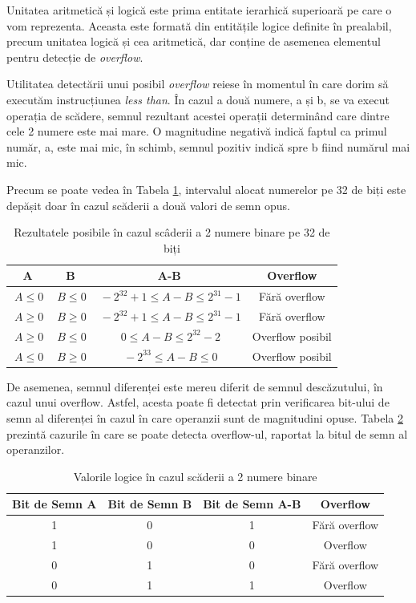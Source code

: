 \documentclass[12pt]{article}
\begin{document}
Unitatea aritmetică și logică este prima entitate ierarhică superioară pe care o vom reprezenta. Aceasta este formată din entitățile logice definite în prealabil, precum unitatea logică și cea aritmetică, dar conține de asemenea elementul pentru detecție de \textit{overflow}.

Utilitatea detectării unui posibil \textit{overflow} reiese în momentul în care dorim să executăm instrucțiunea \textit{less than}. În cazul a două numere, a și b, se va execut operația de scădere, semnul rezultant acestei operații determinând care dintre cele 2 numere este mai mare. O magnitudine negativă indică faptul ca primul număr, a, este mai mic, în schimb, semnul pozitiv indică spre b fiind numărul mai mic.

Precum se poate vedea în Tabela \ref{Tabela:14}, intervalul alocat numerelor pe 32 de biți este depășit doar în cazul scăderii a două valori de semn opus.

\begin{table}[h]
\centering
\caption{Rezultatele posibile în cazul scâderii a 2 numere binare pe 32 de biți}
\label{Tabela:14}
\begin{tabular}{ ||c|c|c|c|| }
 \hline
 A & B & A-B & Overflow\\ 
 \hline  \hline
  $\ A \le 0$ & $\ B \le 0$ & $\ -2^{32} +1\le A-B \le 2^{31} - 1$ & Fără overflow \\
 \hline
  $\ A \ge 0$ & $\ B \ge 0$ & $\ -2^{32} +1\le A-B \le 2^{31} - 1$ & Fără overflow \\
 \hline
  $\ A \ge 0$ & $\ B \le 0$ & $\ 0 \le A-B \le 2^{32} - 2$ &  Overflow posibil\\
 \hline
  $\ A \le 0$ & $\ B \ge 0$ & $\ -2^{33} \le A-B \le 0$ &   Overflow posibil\\
 
  \hline  
\end{tabular}
\end{table}

De asemenea, semnul diferenței este mereu diferit de semnul descăzutului, în cazul unui overflow. Astfel, acesta poate fi detectat prin verificarea bit-ului de semn al diferenței în cazul în care operanzii sunt de magnitudini opuse. Tabela \ref{Tabela:15} prezintă cazurile în care se poate detecta overflow-ul, raportat la bitul de semn al operanzilor.

\begin{table}[h]
\centering
\caption{Valorile logice în cazul scăderii a 2 numere binare}
\label{Tabela:15}
\begin{tabular}{ ||c|c|c|c|| }
 \hline
 Bit de Semn A &  Bit de Semn B &  Bit de Semn A-B & Overflow\\ 
 \hline  \hline
  1 & 0& 1 & Fără overflow \\
  \hline
  1 & 0& 0 & Overflow \\
 \hline
  0 & 1& 0 & Fără overflow \\
 \hline
 0 &1& 1 &  Overflow \\
  \hline  
\end{tabular}
\end{table}
\end{document}
